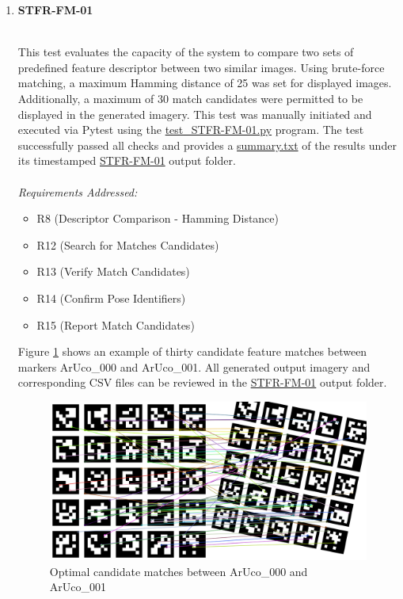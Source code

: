 \documentclass[12pt, titlepage]{article}
\begin{document}
\begin{enumerate}


\item \hypertarget{STFR-FM-01}{\textbf{STFR-FM-01}}\\
This test evaluates the capacity of the system to compare two sets of predefined feature descriptor between two similar images. Using brute-force matching, a maximum Hamming distance of 25 was set for displayed images. Additionally, a maximum of 30 match candidates were permitted to be displayed in the generated imagery. This test was manually initiated and executed via Pytest using the \href{https://github.com/KiranSingh15/CAS-741-Image-Correspondences/blob/main/src/tests/test_STFR-FM-01.py}{test\_STFR-FM-01.py} program. The test successfully passed all checks and provides a \href{https://github.com/KiranSingh15/CAS-741-Image-Correspondences/blob/main/src/tests/Outputs/2025-04-13_12-18-08/summary.txt}{summary.txt} of the results under its timestamped \href{https://github.com/KiranSingh15/CAS-741-Image-Correspondences/tree/main/src/tests/Outputs/2025-04-13_12-18-08}{STFR-FM-01} output folder. \\ \\
\textit{Requirements Addressed:} 
\begin{itemize}
\item R8 (Descriptor Comparison - Hamming Distance)
\item R12 (Search for Matches Candidates)
\item R13 (Verify Match Candidates)
\item R14 (Confirm Pose Identifiers)
\item R15 (Report Match Candidates)
\end{itemize}

Figure \ref{fig-FM-AR} shows an example of thirty candidate feature matches between markers ArUco\_000 and ArUco\_001. All generated output imagery and corresponding CSV files can be reviewed in the \href{https://github.com/KiranSingh15/CAS-741-Image-Correspondences/tree/main/src/tests/Outputs/2025-04-13_12-18-08}{STFR-FM-01} output folder.\\

\begin{figure}
  \centering
  \includegraphics[width=0.95\linewidth]{images/aruco_000_aruco_001.png}
  \caption{Optimal candidate matches between ArUco\_000 and ArUco\_001}
  \label{fig-FM-AR}
\end{figure}



\end{enumerate}
\end{document}
